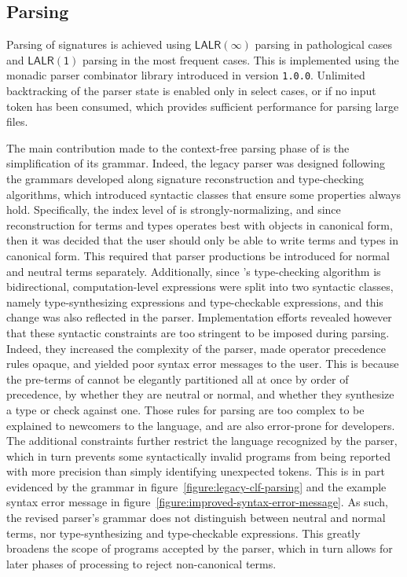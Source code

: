\subsection{Parsing}

Parsing of \Beluga signatures is achieved using $ \mathsf{LALR(\infty)} $ parsing in pathological cases and $ \mathsf{LALR(1)} $ parsing in the most frequent cases.
This is implemented using the monadic parser combinator library introduced in \Beluga version \texttt{1.0.0}.
Unlimited backtracking of the parser state is enabled only in select cases, or if no input token has been consumed, which provides sufficient performance for parsing large \Beluga files.

The main contribution made to the context-free parsing phase of \Beluga is the simplification of its grammar.
Indeed, the legacy parser was designed following the grammars developed along signature reconstruction and type-checking algorithms, which introduced syntactic classes that ensure some properties always hold.
Specifically, the index level \LF of \Beluga is strongly-normalizing, and since reconstruction for \LF terms and types operates best with objects in canonical form, then it was decided that the user should only be able to write \LF terms and types in canonical form.
This required that parser productions be introduced for normal and neutral terms separately.
Additionally, since \Beluga's type-checking algorithm is bidirectional, computation-level expressions were split into two syntactic classes, namely type-synthesizing expressions and type-checkable expressions, and this change was also reflected in the parser.
Implementation efforts revealed however that these syntactic constraints are too stringent to be imposed during parsing.
Indeed, they increased the complexity of the parser, made operator precedence rules opaque, and yielded poor syntax error messages to the user.
This is because the pre-terms of \Beluga cannot be elegantly partitioned all at once by order of precedence, by whether they are neutral or normal, and whether they synthesize a type or check against one.
Those rules for parsing are too complex to be explained to newcomers to the language, and are also error-prone for developers.
The additional constraints further restrict the language recognized by the parser, which in turn prevents some syntactically invalid programs from being reported with more precision than simply identifying unexpected tokens.
This is in part evidenced by the grammar in figure~\ref{figure:legacy-clf-parsing} and the example syntax error message in figure~\ref{figure:improved-syntax-error-message}.
As such, the revised parser's grammar does not distinguish between neutral and normal terms, nor type-synthesizing and type-checkable expressions.
This greatly broadens the scope of programs accepted by the parser, which in turn allows for later phases of processing to reject non-canonical terms.

